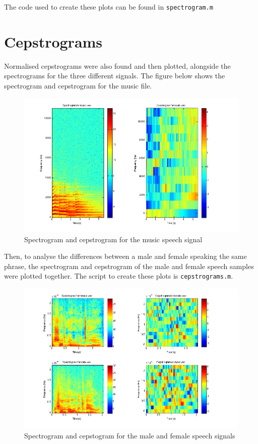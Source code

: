 \documentclass[11pt]{article}   %
\begin{document}
The code used to create these plots can be found in \texttt{spectrogram.m}

\newpage

\section{Cepstrograms}

Normalised cepstrograms were also found and then plotted, alongside the spectrograms for the three different signals. The figure below shows the spectrogram and cepstrogram for the music file. 

\begin{figure}[H]
\begin{center}
\leavevmode
\includegraphics[width=1\textwidth]{musicCepstro.png}
\end{center}
\caption{Spectrogram and cepstrogram for the music speech signal}
\label{euler:1}
\end{figure}

\newpage
Then, to analyse the differences between a male and female speaking the same phrase, the spectrogram and cepstrogram of the male and female speech samples were plotted together. The script to create these plots is \texttt{cepstrograms.m}.


\begin{figure}[H]
\begin{center}
\leavevmode
\includegraphics[width=1\textwidth]{speechCepstro.png}
\end{center}
\caption{Spectrogram and cepstogram for the male and female speech signals}
\label{euler:1}
\end{figure}
\end{document}
